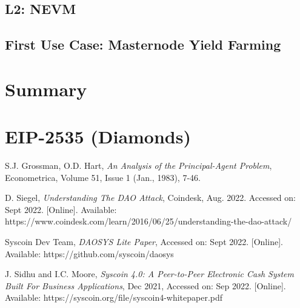 \documentclass[journal,twocolumn,12pt]{ieeesyscoin}
\begin{document}
\subsection{L2: NEVM}

\lipsum[1]

\subsection{First Use Case: Masternode Yield Farming}

\lipsum[1]

\section{Summary}
\label{section:summary}
\lipsum[1]

\appendices

\section{EIP-2535 (Diamonds)}

\lipsum[1]

\begin{thebibliography}{00}

 S.J. Grossman, O.D. Hart, \textit{An Analysis of the Principal-Agent Problem}, Econometrica, Volume 51, Issue 1 (Jan., 1983), 7-46.

 D. Siegel, \textit{Understanding The DAO Attack}, Coindesk, Aug. 2022. Accessed on: Sept 2022. [Online]. Available: https://www.coindesk.com/learn/2016/06/25/understanding-the-dao-attack/

 Syscoin Dev Team, \textit{DAOSYS Lite Paper}, Accessed on: Sept 2022.  [Online]. Available:  https://github.com/syscoin/daosys

 J. Sidhu and I.C. Moore, \textit{Syscoin 4.0: A Peer-to-Peer Electronic Cash System Built For Business Applications}, Dec 2021, Accessed on: Sep 2022.  [Online]. Available:  https://syscoin.org/file/syscoin4-whitepaper.pdf

\end{thebibliography}


\EOD
\end{document}
